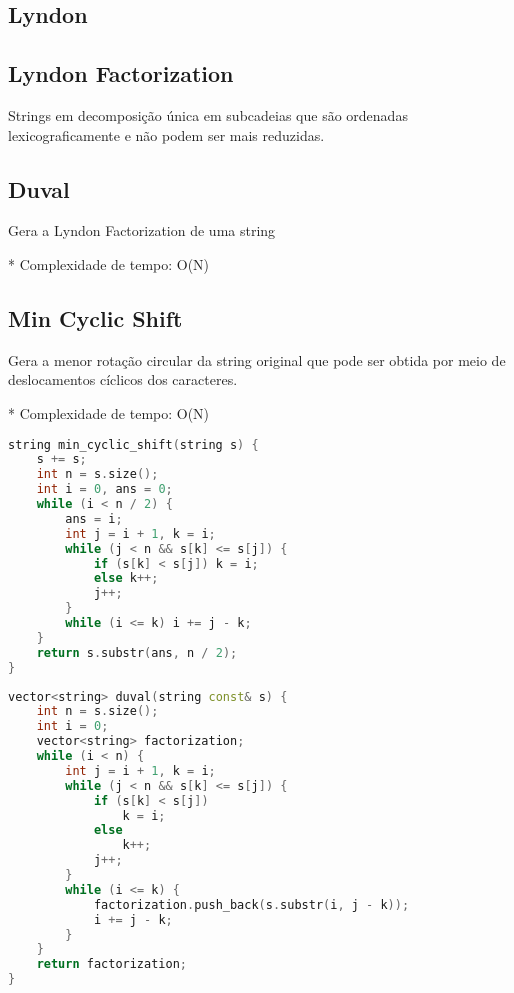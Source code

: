 \documentclass[11pt, a4paper, twoside]{article}
\begin{document}
\subsection{Lyndon}

\subsection{Lyndon Factorization}


Strings em decomposição única em subcadeias que são ordenadas lexicograficamente e não podem ser mais reduzidas.

\subsection{Duval}


Gera a Lyndon Factorization de uma string

* Complexidade de tempo: O(N)

\subsection{Min Cyclic Shift}


Gera a menor rotação circular da string original que pode ser obtida por meio de deslocamentos cíclicos dos caracteres.

* Complexidade de tempo: O(N)


\begin{multicols}{2}
\begin{lstlisting}[language=C++]
string min_cyclic_shift(string s) {
    s += s;
    int n = s.size();
    int i = 0, ans = 0;
    while (i < n / 2) {
        ans = i;
        int j = i + 1, k = i;
        while (j < n && s[k] <= s[j]) {
            if (s[k] < s[j]) k = i;
            else k++;
            j++;
        }
        while (i <= k) i += j - k;
    }
    return s.substr(ans, n / 2);
}
\end{lstlisting}
\end{multicols}

\begin{lstlisting}[language=C++]
vector<string> duval(string const& s) {
    int n = s.size();
    int i = 0;
    vector<string> factorization;
    while (i < n) {
        int j = i + 1, k = i;
        while (j < n && s[k] <= s[j]) {
            if (s[k] < s[j])
                k = i;
            else
                k++;
            j++;
        }
        while (i <= k) {
            factorization.push_back(s.substr(i, j - k));
            i += j - k;
        }
    }
    return factorization;
}
\end{lstlisting}
\end{document}
